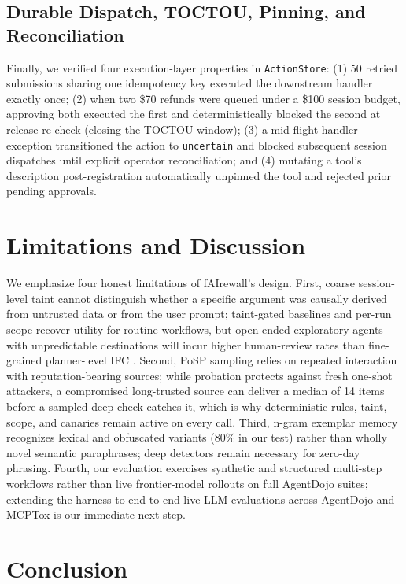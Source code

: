 \documentclass[conference]{IEEEtran}
\begin{document}
\subsection{Durable Dispatch, TOCTOU, Pinning, and Reconciliation}
Finally, we verified four execution-layer properties in \texttt{ActionStore}: (1) 50 retried submissions sharing one idempotency key executed the downstream handler exactly once; (2) when two \$70 refunds were queued under a \$100 session budget, approving both executed the first and deterministically blocked the second at release re-check (closing the TOCTOU window); (3) a mid-flight handler exception transitioned the action to \texttt{uncertain} and blocked subsequent session dispatches until explicit operator reconciliation; and (4) mutating a tool's description post-registration automatically unpinned the tool and rejected prior pending approvals.

\section{Limitations and Discussion}

We emphasize four honest limitations of fAIrewall's design. First, coarse session-level taint cannot distinguish whether a specific argument was causally derived from untrusted data or from the user prompt; taint-gated baselines and per-run scope recover utility for routine workflows, but open-ended exploratory agents with unpredictable destinations will incur higher human-review rates than fine-grained planner-level IFC \cite{debenedetti2025camel, costa2025fides}. Second, PoSP sampling relies on repeated interaction with reputation-bearing sources; while probation protects against fresh one-shot attackers, a compromised long-trusted source can deliver a median of 14 items before a sampled deep check catches it, which is why deterministic rules, taint, scope, and canaries remain active on every call. Third, n-gram exemplar memory recognizes lexical and obfuscated variants (80\% in our test) rather than wholly novel semantic paraphrases; deep detectors remain necessary for zero-day phrasing. Fourth, our evaluation exercises synthetic and structured multi-step workflows rather than live frontier-model rollouts on full AgentDojo suites; extending the harness to end-to-end live LLM evaluations across AgentDojo and MCPTox is our immediate next step.

\section{Conclusion}
\end{document}
